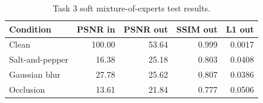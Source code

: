 \begin{table}[t]
\centering
\caption{Task 3 soft mixture-of-experts test results.}
\label{tab:t3_type}
\footnotesize
\begin{tabular}{lrrrr}
\toprule
Condition & PSNR in & PSNR out & SSIM out & L1 out \\
\midrule
Clean & 100.00 & 53.64 & 0.999 & 0.0017 \\
Salt-and-pepper & 16.38 & 25.18 & 0.803 & 0.0408 \\
Gaussian blur & 27.78 & 25.62 & 0.807 & 0.0386 \\
Occlusion & 13.61 & 21.84 & 0.777 & 0.0506 \\
\bottomrule
\end{tabular}
\end{table}

